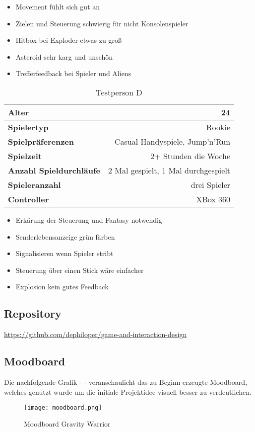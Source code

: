 \documentclass[11pt]{scrartcl}
\begin{document}
\begin{itemize}
\setlength{\parskip}{0pt}
\item Movement fühlt sich gut an
\item Zielen und Steuerung schwierig für nicht Konsolenspieler
\item Hitbox bei Exploder etwas zu groß
\item Asteroid sehr karg und unschön
\item Trefferfeedback bei Spieler und Aliens
\end{itemize}

\begin{table}[htp]
\centering
\begin{tabular}{|l|r|}
\hline
\textbf{Alter} &24\\
\hline
\textbf{Spielertyp} &Rookie\\
\hline
\textbf{Spielpräferenzen} &Casual Handyspiele, Jump'n'Run\\
\hline
\textbf{Spielzeit} &2+ Stunden die Woche\\
\hline
\textbf{Anzahl Spieldurchläufe} &2 Mal gespielt, 1 Mal durchgespielt\\
\hline
\textbf{Spieleranzahl} &drei Spieler\\
\hline
\textbf{Controller} &XBox 360\\
\hline
\end{tabular}
\caption{Testperson D}
\label{tab:test-d}
\end{table}

\begin{itemize}
\setlength{\parskip}{0pt}
\item Erkärung der Steuerung und Fantasy notwendig
\item Senderlebensanzeige grün färben
\item Signalisieren wenn Spieler stribt
\item Steuerung über einen Stick wäre einfacher
\item Explosion kein gutes Feedback
\end{itemize}

\newpage
\subsection{Repository}
\url{https://github.com/dephiloper/game-and-interaction-design}
\subsection{Moodboard}
Die nachfolgende Grafik -  - veranschaulicht das zu Beginn erzeugte Moodboard, welches genutzt wurde um die initiale Projektidee visuell besser zu verdeutlichen.

\begin{figure}[htp]
	\centering
	\texttt{[image: moodboard.png]}
	\caption{Moodboard Gravity Warrior}
	\label{fig:mood-board}
\end{figure}

\newpage


\newpage
\listoffigures 
\listoftables 
\end{document}
